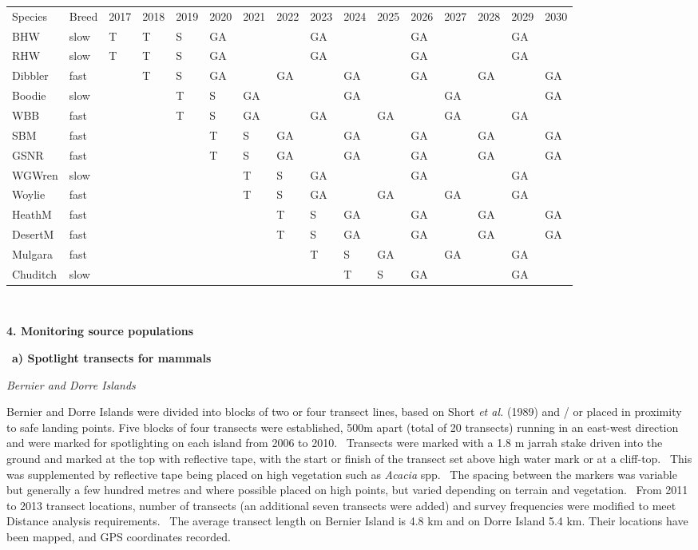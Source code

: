 \documentclass[version=last,
    paper=a4,                               %
    10pt,                                   %
    dvipsnames,
    oneside,                              %
    headings=openany,                       %
    open=any,
    BCOR=7mm,                               %
    DIV=15,     %
]{scrbook}
\begin{document}
\begin{longtable}[]{@{}llllllllllllllll@{}}
\toprule
\endhead
Species & Breed & 2017 & 2018 & 2019 & 2020 & 2021 & 2022 & 2023 & 2024
& 2025 & 2026 & 2027 & 2028 & 2029 & 2030\tabularnewline
BHW & slow & T & T & S & GA & ~ & ~ & GA & ~ & ~ & GA & ~ & ~ & GA &
~\tabularnewline
RHW & slow & T & T & S & GA & ~ & ~ & GA & ~ & ~ & GA & ~ & ~ & GA &
~\tabularnewline
Dibbler & fast & ~ & T & S & GA & ~ & GA & ~ & GA & ~ & GA & ~ & GA & ~
& GA\tabularnewline
Boodie & slow & ~ & ~ & T & S & GA & ~ & ~ & GA & ~ & ~ & GA & ~ & ~ &
GA\tabularnewline
WBB & fast & ~ & ~ & T & S & GA & ~ & GA & ~ & GA & ~ & GA & ~ & GA &
~\tabularnewline
SBM & fast & ~ & ~ & ~ & T & S & GA & ~ & GA & ~ & GA & ~ & GA & ~ &
GA\tabularnewline
GSNR & fast & ~ & ~ & ~ & T & S & GA & ~ & GA & ~ & GA & ~ & GA & ~ &
GA\tabularnewline
WGWren & slow & ~ & ~ & ~ & ~ & T & S & GA & ~ & ~ & GA & ~ & ~ & GA &
~\tabularnewline
Woylie & fast & ~ & ~ & ~ & ~ & T & S & GA & ~ & GA & ~ & GA & ~ & GA &
~\tabularnewline
HeathM & fast & ~ & ~ & ~ & ~ & ~ & T & S & GA & ~ & GA & ~ & GA & ~ &
GA\tabularnewline
DesertM & fast & ~ & ~ & ~ & ~ & ~ & T & S & GA & ~ & GA & ~ & GA & ~ &
GA\tabularnewline
Mulgara & fast & ~ & ~ & ~ & ~ & ~ & ~ & T & S & GA & ~ & GA & ~ & GA &
~\tabularnewline
Chuditch & slow & ~ & ~ & ~ & ~ & ~ & ~ & ~ & T & S & GA & ~ & ~ & GA &
~\tabularnewline
\bottomrule
\end{longtable}

~

\textbf{4. Monitoring source populations}

~\textbf{a) Spotlight transects for mammals}

\emph{Bernier and Dorre Islands}

Bernier and Dorre Islands were divided into blocks of two or four
transect lines, based on Short \emph{et al.} (1989) and / or placed in
proximity to safe landing points. Five blocks of four transects were
established, 500m apart (total of 20 transects) running in an east-west
direction and were marked for spotlighting on each island from 2006 to
2010.~ Transects were marked with a 1.8 m jarrah stake driven into the
ground and marked at the top with reflective tape, with the start or
finish of the transect set above high water mark or at a cliff-top.
~This was supplemented by reflective tape being placed on high
vegetation such as \emph{Acacia} spp.~ The spacing between the markers
was variable but generally a few hundred metres and where possible
placed on high points, but varied depending on terrain and vegetation.~
From 2011 to 2013 transect locations, number of transects (an additional
seven transects were added) and survey frequencies were modified to meet
Distance analysis requirements.~ The average transect length on Bernier
Island is 4.8 km and on Dorre Island 5.4 km. Their locations have been
mapped, and GPS coordinates recorded.
\end{document}
